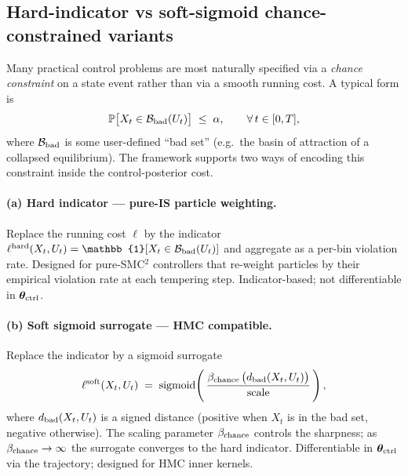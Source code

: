 \subsection{Hard-indicator vs soft-sigmoid chance-constrained variants}
\label{sec:control-cost-variants}

Many practical control problems are most naturally specified via a
\emph{chance constraint} on a state event rather than via a smooth
running cost. A typical form is
\begin{equation}
\mathbb{P}\bigl[X_t \in \mathcal{B}_{\rm bad}(U_t)\bigr] \;\le\; \alpha,
\qquad \forall\, t \in [0, T],
\label{eq:chance-constraint}
\end{equation}
where $\mathcal{B}_{\rm bad}$ is some user-defined ``bad set'' (e.g.\
the basin of attraction of a collapsed equilibrium). The framework
supports two ways of encoding this constraint inside the
control-posterior cost.

\paragraph{(a) Hard indicator --- pure-IS particle weighting.}
Replace the running cost $\ell$ by the indicator
$\ell^{\rm hard}(X_t, U_t) = \mathbb{1}[X_t \in \mathcal{B}_{\rm bad}(U_t)]$
and aggregate as a per-bin violation rate. Designed for pure-SMC$^2$
controllers that re-weight particles by their empirical violation
rate at each tempering step. Indicator-based; not differentiable in
$\bm{\theta}_{\rm ctrl}$.

\paragraph{(b) Soft sigmoid surrogate --- HMC compatible.}
Replace the indicator by a sigmoid surrogate
\begin{equation}
\ell^{\rm soft}(X_t, U_t) \;=\;
   \mathrm{sigmoid}\!\left(\,\frac{\beta_{\rm chance}\,\bigl(d_{\rm bad}(X_t, U_t)\bigr)}
                          {\rm scale}\,\right),
\label{eq:soft-surrogate}
\end{equation}
where $d_{\rm bad}(X_t, U_t)$ is a signed distance (positive when
$X_t$ is in the bad set, negative otherwise). The scaling parameter
$\beta_{\rm chance}$ controls the sharpness; as
$\beta_{\rm chance} \to \infty$ the surrogate converges to the hard
indicator. Differentiable in $\bm{\theta}_{\rm ctrl}$ via the trajectory; designed
for HMC inner kernels.

